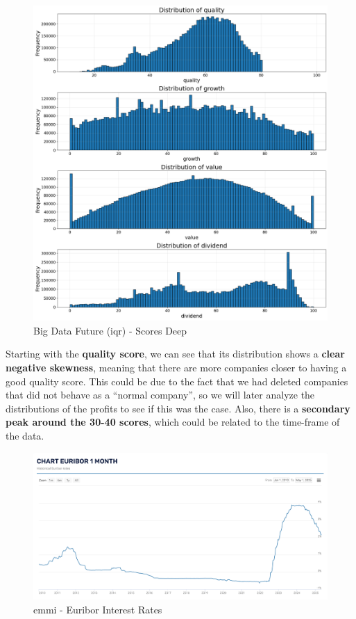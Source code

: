 \documentclass[11pt,english,a4paper,hidelinks]{book}
\begin{document}
\begin{figure}[H]
\begin{minipage}{0.5\textwidth}
        \includegraphics[width=\linewidth]{images/code/descriptive analysis/distributions/Big Data future IQR - Scores Deep.png}
        \caption{Big Data Future (\acrshort{iqr}) - Scores Deep}
        \label{fig:scores_deep}
    \end{minipage}
\end{figure}

\noindent Starting with the \textbf{quality score}, we can see that its distribution shows a \textbf{clear negative skewness}, meaning that there are more companies closer to having a good quality score. This could be due to the fact that we had deleted companies that did not behave as a ``normal company'', so we will later analyze the distributions of the profits to see if this was the case. Also, there is a \textbf{secondary peak around the 30-40 scores}, which could be related to the time-frame of the data.

\begin{figure}[H]
    \centering
    \includegraphics[width=1\linewidth]{images/macros/Euribor.png}
    \caption{\acrshort{emmi} - Euribor Interest Rates}
    \label{fig:euribor}
\end{figure}
\end{document}
